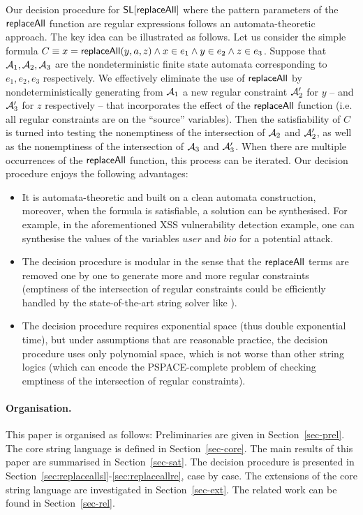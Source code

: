 Our decision procedure for $\mathsf{SL}[\mathsf{replaceAll}]$ where the pattern parameters
of the $\mathsf{replaceAll}$ function are regular expressions follows an 
automata-theoretic approach. The key idea can be illustrated as follows. Let 
us consider the simple formula $C \equiv x = \mathsf{replaceAll}(y, a, z) \wedge x \in e_1 \wedge y \in e_2 \wedge z \in e_3$. 
Suppose that $\mathcal{A}_1,\mathcal{A}_2,\mathcal{A}_3$ are the nondeterministic finite state automata corresponding to $e_1,e_2,e_3$ respectively. 
We effectively eliminate the use of $\mathsf{replaceAll}$ by nondeterministically
generating from $\mathcal{A}_1$ a new regular constraint $\mathcal{A}'_2$ for $y$ -- and
$\mathcal{A}'_3$ for $z$ respectively -- that incorporates the effect of the
$\mathsf{replaceAll}$ function (i.e. all regular constraints are on the ``source'' variables).
Then the satisfiability of $C$ is turned into testing the nonemptiness of the intersection of $\mathcal{A}_2$ and $\mathcal{A}'_2$, as well as the nonemptiness of the intersection of $\mathcal{A}_3$ and $\mathcal{A}'_3$. When there are multiple occurrences of the $\mathsf{replaceAll}$ function, this process can be iterated. 
Our decision procedure enjoys the following advantages:
\begin{itemize}
	\item It is automata-theoretic and built on a clean automata construction, 
        moreover, when the formula is satisfiable, a solution can be 
        synthesised. For example, in the aforementioned XSS vulnerability detection example, one can synthesise the values of the variables $user$ and $bio$ for a potential attack. 
	\item The decision procedure is modular in
        the sense that the $\mathsf{replaceAll}$ terms are removed one by one to
        generate more and more regular constraints (emptiness of the
        intersection of regular constraints could be efficiently handled by
        the state-of-the-art string solver like \cite{fang-yu-circuits}).  
    \item The decision procedure requires exponential space (thus double
        exponential time), but under assumptions that are reasonable practice, 
        the decision procedure uses only polynomial space, which is not
        worse than other string logics (which can encode the PSPACE-complete
        problem of checking emptiness of the intersection of regular 
        constraints). 
\end{itemize}


%


\paragraph{Organisation.} 
This paper is organised as follows: Preliminaries are given in Section~\ref{sec-prel}. The core string language is defined in Section~\ref{sec-core}. The main results of this paper are summarised in Section~\ref{sec-sat}. The decision procedure is presented in Section~\ref{sec:replaceallsl}-\ref{sec:replaceallre}, case by case. The extensions of the core string language are investigated in Section~\ref{sec-ext}. The related work can be found in Section~\ref{sec-rel}.
